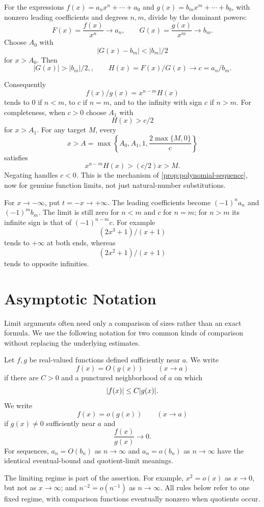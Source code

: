 For the expressions $f(x)=a_nx^n+\cdots+a_0$ and
$g(x)=b_mx^m+\cdots+b_0$, with nonzero leading coefficients and
degrees $n,m$, divide by the dominant powers:
\[
F(x)=\frac{f(x)}{x^n}\to a_n,
\qquad
G(x)=\frac{g(x)}{x^m}\to b_m.
\]
Choose $A_0$ with
\[
|G(x)-b_m|<|b_m|/2
\]
 for $x>A_0$.
Then
\[
|G(x)|>|b_m|/2,,\qquad H(x)=F(x)/G(x)\to c=a_n/b_m.
\]

Consequently
\[
f(x)/g(x)=x^{n-m}H(x)
\]
 tends to $0$ if $n<m$,
to $c$ if $n=m$, and to the infinity with sign $c$ if $n>m$.
For completeness, when $c>0$ choose $A_1$ with
\[
H(x)>c/2
\]
 for
$x>A_1$. For any target $M$, every
\[
x>A=\max\left\{A_0,A_1,1,\frac{2\max\{M,0\}}c\right\}
\]
satisfies
\[
x^{n-m}H(x)>(c/2)x>M.
\]
 Negating handles $c<0$.
This is the mechanism of \cref{prop:polynomial-sequence}, now for
genuine function limits, not just natural-number substitutions.

For $x\to-\infty$, put $t=-x\to+\infty$.
The leading coefficients become $(-1)^na_n$ and $(-1)^mb_m$.
The limit is still zero for $n<m$ and $c$ for $n=m$;
for $n>m$ its infinite sign is that of $(-1)^{n-m}c$.
For example
\[
(2x^3+1)/(x+1)
\]
 tends to $+\infty$ at both ends,
whereas
\[
(2x^2+1)/(x+1)
\]
 tends to opposite infinities.

\section{Asymptotic Notation}

Limit arguments often need only a comparison of sizes rather than an exact
formula. We use the following notation for two common kinds of
comparison without replacing the underlying estimates.

\begin{definition}
Let $f,g$ be real-valued functions defined sufficiently near $a$.  We write
\[
f(x)=O(g(x))\qquad(x\to a)
\]
if there are $C>0$ and a punctured neighborhood of $a$ on which
\[
\lvert f(x)\rvert\leq C\lvert g(x)\rvert.
\]
We write
\[
f(x)=o(g(x))\qquad(x\to a)
\]
if $g(x)\ne0$ sufficiently near $a$ and
\[
\frac{f(x)}{g(x)}\longrightarrow0.
\]
For sequences, $a_n=O(b_n)$ as $n\to\infty$ and $a_n=o(b_n)$ as
$n\to\infty$ have the identical eventual-bound and quotient-limit meanings.
\end{definition}

The limiting regime is part of the assertion. For example,
$x^2=o(x)$ as $x\to0$, but not as $x\to\infty$; and
$n^{-2}=o(n^{-1})$ as $n\to\infty$. All rules below refer to one fixed
regime, with comparison functions eventually nonzero when quotients occur.

